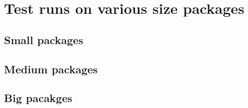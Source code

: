\begin{chapterabstract}
\end{chapterabstract}

\section{Test runs on various size packages}


\subsection{Small packages}


\subsection{Medium packages}


\subsection{Big pacakges}

